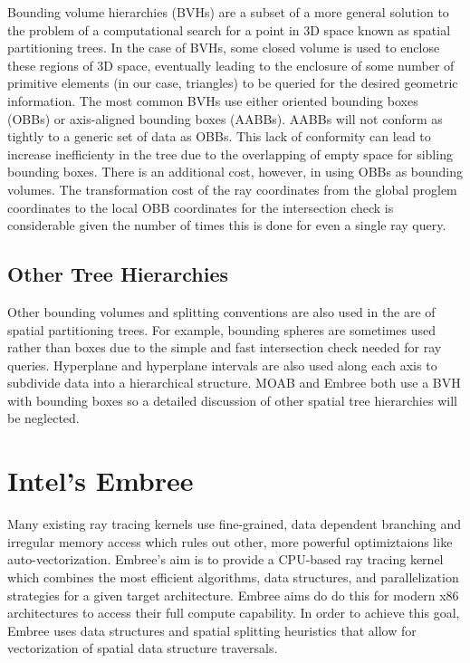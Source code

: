\documentclass{anstrans}
\begin{document}
Bounding volume hierarchies (BVHs) are a subset of a more general solution to the problem of a computational search for a point in 3D space known as spatial partitioning trees. In the case of BVHs, some closed volume is used to enclose these regions of 3D space, eventually leading to the enclosure of some number of primitive elements (in our case, triangles) to be queried for the desired geometric information. The most common BVHs use either oriented bounding boxes (OBBs) or axis-aligned bounding boxes (AABBs). AABBs will not conform as tightly to a generic set of data as OBBs. This lack of conformity can lead to increase inefficienty in the tree due to the overlapping of empty space for sibling bounding boxes. There is an additional cost, however, in using OBBs as bounding volumes. The transformation cost of the ray coordinates from the global proglem coordinates to the local OBB coordinates for the intersection check is considerable given the number of times this is done for even a single ray query. 

\subsection{Other Tree Hierarchies} 

Other bounding volumes and splitting conventions are also used in the are of spatial partitioning trees. For example, bounding spheres are sometimes used rather than boxes due to the simple and fast intersection check needed for ray queries. Hyperplane and hyperplane intervals are also used along each axis to subdivide data into a hierarchical structure. MOAB and Embree both use a BVH with bounding boxes so a detailed discussion of other spatial tree hierarchies will be neglected.

\section{Intel's Embree}

Many existing ray tracing kernels use fine-grained, data dependent branching and irregular memory access which rules out other, more powerful optimiztaions like auto-vectorization. Embree's aim is to provide a CPU-based ray tracing kernel which combines the most efficient algorithms, data structures, and parallelization strategies for a given target architecture. Embree aims do do this for modern x86 architectures to access their full compute capability. In order to achieve this goal, Embree uses data structures and spatial splitting heuristics that allow for vectorization of spatial data structure traversals. \cite{embree} 
\end{document}
